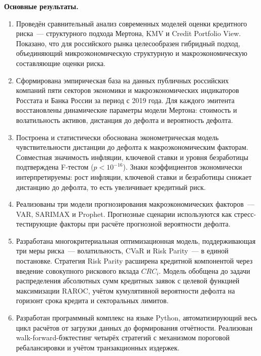 \documentclass[]{article}
\begin{document}
	\textbf{Основные результаты.}
	\begin{enumerate}
		\item Проведён сравнительный анализ современных моделей оценки кредитного риска~--- структурного подхода Мертона, KMV и Credit Portfolio View. Показано, что для российского рынка
		      целесообразен гибридный подход, объединяющий микроэкономическую структурную и
		      макроэкономическую составляющие оценки риска.
		\item Сформирована эмпирическая база на данных публичных российских компаний пяти секторов
		      экономики и макроэкономических индикаторов Росстата и Банка России за период
с 2019 года. Для каждого эмитента восстановлены динамические параметры модели Мертона:
		      стоимость и волатильность активов, дистанция до дефолта и вероятность дефолта.
		\item Построена и статистически обоснована эконометрическая модель чувствительности
		      дистанции до дефолта к макроэкономическим факторам. Совместная значимость
		      инфляции, ключевой ставки и уровня безработицы подтверждена F-тестом
		      ($p < 10^{-16}$). Знаки коэффициентов экономически интерпретируемы: рост
		      инфляции, ключевой ставки и безработицы снижает дистанцию до дефолта,
		      то есть увеличивает кредитный риск.
		\item Реализованы три модели прогнозирования макроэкономических факторов~--- VAR, SARIMAX и Prophet. Прогнозные сценарии используются как
		      стресс-тестирующие факторы при расчёте прогнозной вероятности дефолта.
		\item Разработана многокритериальная оптимизационная модель, поддерживающая три
		      меры риска~--- волатильность, CVaR и Risk Parity~--- в единой постановке. Стратегия
		      Risk Parity расширена кредитной компонентой через введение совокупного рискового
		      вклада $CRC_i$. Модель обобщена до задачи распределения абсолютных сумм кредитных
		      заявок с целевой функцией максимизации RAROC, учётом кумулятивной вероятности
		      дефолта на горизонт срока кредита и секторальных лимитов.
		\item Разработан программный комплекс на языке Python, автоматизирующий весь
		      цикл расчётов от загрузки данных до формирования отчётности.
		      Реализован walk-forward-бэктестинг четырёх стратегий с механизмом пороговой
		      ребалансировки и учётом транзакционных издержек.
	\end{enumerate}
\end{document}
